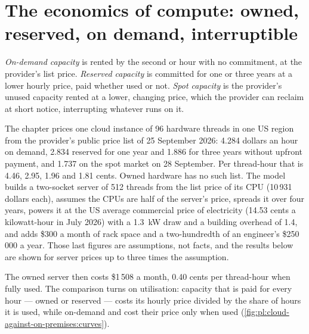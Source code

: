 \section{The economics of compute: owned, reserved, on demand, interruptible}

\begin{definition}\label{def:pl:cloud-against-on-premises:capacity}
\emph{On-demand capacity} is rented by the second or hour with no commitment, at the provider's list price.
\emph{Reserved capacity} is committed for one or three years at a lower hourly price, paid whether used or not.
\emph{Spot capacity} is the provider's unused capacity rented at a lower, changing price, which the provider can reclaim
at short notice, interrupting whatever runs on it.
\end{definition}

The chapter prices one cloud instance of 96 hardware threads in one US region from the provider's public price list of 25 September 2026: 4.284
dollars an hour on demand, 2.834 reserved for one year and 1.886 for three years without upfront payment, and 1.737 on the spot market on 28
September. Per thread-hour that is 4.46, 2.95, 1.96 and 1.81 cents. Owned hardware has no such list. The model builds a two-socket server of
512 threads from the list price of its CPU (10\,931 dollars each), assumes the CPUs are half of the server's price, spreads it over four years,
powers it at the US average commercial price of electricity (14.53 cents a kilowatt-hour in July 2026) with a 1.3~kW draw and a building
overhead of 1.4, and adds \$300 a month of rack space and a two-hundredth of an engineer's \$250\,000 a year. Those last figures are
assumptions, not facts, and the results below are shown for server prices up to three times the assumption.

\label{lst:pl:cloud-against-on-premises:owned}

The owned server then costs \$1\,508 a month, 0.40 cents per thread-hour when fully used. The comparison turns on utilisation: capacity that is
paid for every hour --- owned or reserved --- costs its hourly price divided by the share of hours it is used, while on-demand and 
cost their price only when used (\cref{fig:pl:cloud-against-on-premises:curves}).

